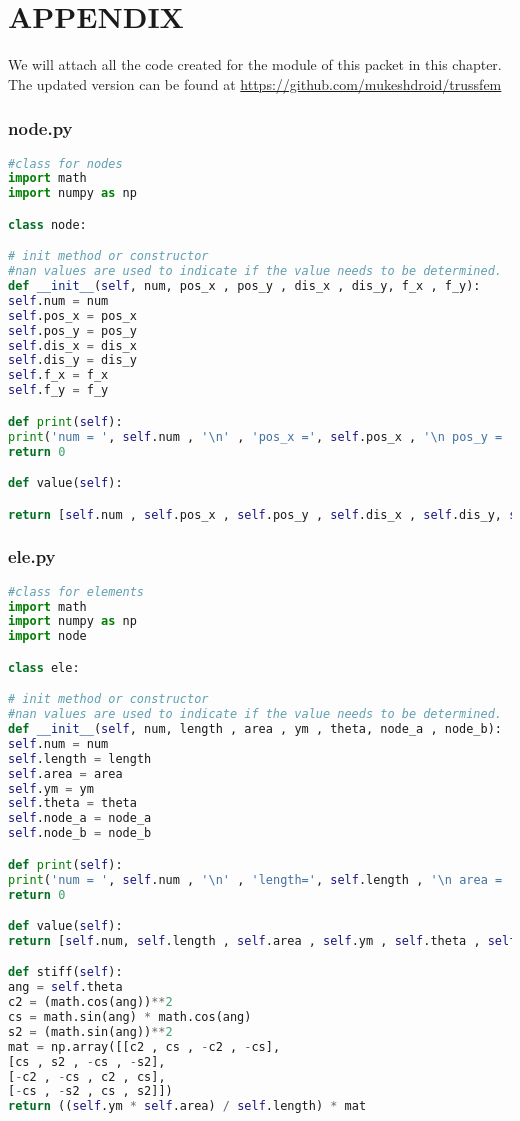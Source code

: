 \chapter*{APPENDIX}

We will attach all the code created for the module of this packet in this chapter. The updated version can be found at \url{https://github.com/mukeshdroid/trussfem}

\subsection*{node.py}
\begin{lstlisting}[language=Python , basicstyle=\linespread{0.75}\listingsfont]
#class for nodes
import math
import numpy as np

class node:

# init method or constructor
#nan values are used to indicate if the value needs to be determined.
def __init__(self, num, pos_x , pos_y , dis_x , dis_y, f_x , f_y):
self.num = num
self.pos_x = pos_x
self.pos_y = pos_y
self.dis_x = dis_x
self.dis_y = dis_y
self.f_x = f_x
self.f_y = f_y

def print(self):
print('num = ', self.num , '\n' , 'pos_x =', self.pos_x , '\n pos_y = ' , self.pos_y , '\n dis_x = ' , self.dis_x , '\n dis_y = ', self.dis_y , '\n f_x = ', self.f_x, '\n f_y = ', self.f_y)
return 0

def value(self):

return [self.num , self.pos_x , self.pos_y , self.dis_x , self.dis_y, self.f_x, self.f_y]
\end{lstlisting}

\subsection*{ele.py}
\begin{lstlisting}[language=Python , basicstyle=\linespread{0.75}\listingsfont]
#class for elements
import math
import numpy as np
import node

class ele:

# init method or constructor 
#nan values are used to indicate if the value needs to be determined.
def __init__(self, num, length , area , ym , theta, node_a , node_b):
self.num = num
self.length = length
self.area = area
self.ym = ym
self.theta = theta
self.node_a = node_a
self.node_b = node_b

def print(self):
print('num = ', self.num , '\n' , 'length=', self.length , '\n area = ' , self.area , '\n youngs modulus = ' , self.ym , '\n theta = ', self.theta , '\n node_a = ', self.node_a, '\n node_b = ', self.node_b)
return 0

def value(self):
return [self.num, self.length , self.area , self.ym , self.theta , self.node_a.num, self.node_b.num]

def stiff(self):
ang = self.theta
c2 = (math.cos(ang))**2
cs = math.sin(ang) * math.cos(ang)
s2 = (math.sin(ang))**2
mat = np.array([[c2 , cs , -c2 , -cs],
[cs , s2 , -cs , -s2],
[-c2 , -cs , c2 , cs],
[-cs , -s2 , cs , s2]])
return ((self.ym * self.area) / self.length) * mat
\end{lstlisting}

